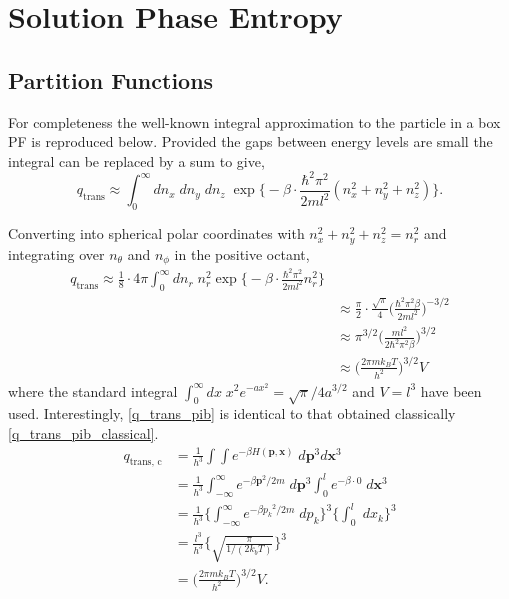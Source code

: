 \documentclass[../main.tex]{subfiles}
\begin{document}
\section{Solution Phase Entropy}
\subsection{Partition Functions} \label{section::appendix_igm_partition_functions}

For completeness the well-known integral approximation to the particle in a box PF is reproduced below. Provided the gaps between energy levels are small the integral can be replaced by a sum to give,
\begin{equation}
	q_\text{trans} \approx \int_0^\infty dn_x\;dn_y\;dn_z\; \exp{ {\Big \{} -{\beta}\cdot  \frac{\hbar^2 \pi^2}{2ml^2}(n_x^2 + n_y^2 + n_z^2)}{\Big \}}.
\end{equation}

Converting into spherical polar coordinates with $n_x^2 + n_y^2 + n_z^2 = n_r^2$ and integrating over $n_\theta$ and $n_\phi$ in the positive octant,
\begin{equation}
	\begin{aligned}
		q_\text{trans} \approx \frac{1}{8} \cdot 4\pi \int_0^\infty dn_r\; n_r^2\exp{ {\Big \{} -{\beta}\cdot  \frac{\hbar^2 \pi^2}{2ml^2}n_r^2}{\Big \}} \\
		&\approx \frac{\pi}{2} \cdot \frac{\sqrt{\pi}}{4} {\Big (} \frac{\hbar^2 \pi^2\beta}{2ml^2} {\Big )}^{-3/2} \\
		&\approx \pi^{3/2} {\Big (} \frac{ml^2}{2\hbar^2 \pi^2\beta} {\Big )}^{3/2} \\
		&\approx {\Big (} \frac{2\pi m k_B T}{h^2} {\Big )}^{3/2} V 
		\label{q_trans_pib}
	\end{aligned}
\end{equation}
where the standard integral $\int_{0}^{\infty} dx\; x^2 e^{-ax^2} = \sqrt{\pi}/4a^{3/2}$ and $V = l^3$ have been used. Interestingly, \eqref{q_trans_pib} is identical to that obtained classically \eqref{q_trans_pib_classical}.
\begin{equation}
	\begin{aligned}
		q_\text{trans, c} &= \frac{1}{h^{3}}\int\int e^{-\beta H(\boldsymbol{p}, \boldsymbol{x})} \; d\boldsymbol{p}^{3} d\boldsymbol{x}^{3} \\
		&= \frac{1}{h^{3}}\int_{-\infty}^\infty e^{-\beta \boldsymbol{p}^2/2m} \; d\boldsymbol{p}^{3} \int_0^l e^{-\beta \cdot 0} \;  d\boldsymbol{x}^{3} \\
		&= \frac{1}{h^{3}} {\Big \{}  \int_{-\infty}^\infty e^{-\beta {p_k}^2/2m} \; d{p_k} {\Big \}}^3 {\Big \{}  \int_0^l  \;  dx_k {\Big \}}^3 \\
		&= \frac{l^3}{h^{3}} {\Big \{}  \sqrt{\frac{\pi}{1/(2 k_b T)}} {\Big \}}^3 \\
		&={\Big (} \frac{2\pi m k_B T}{h^2} {\Big )}^{3/2} V.
		\label{q_trans_pib_classical}
	\end{aligned}
\end{equation}
\end{document}
